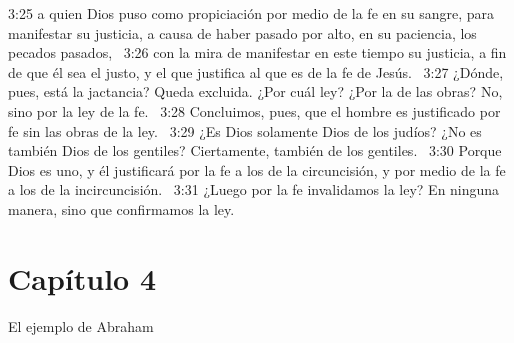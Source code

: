 3:25 a quien Dios puso como propiciación por medio de la fe en su sangre, para manifestar su justicia, a causa de haber pasado por alto, en su paciencia, los pecados pasados,  
3:26 con la mira de manifestar en este tiempo su justicia, a fin de que él sea el justo, y el que justifica al que es de la fe de Jesús.  
3:27 ¿Dónde, pues, está la jactancia? Queda excluida. ¿Por cuál ley? ¿Por la de las obras? No, sino por la ley de la fe.  
3:28 Concluimos, pues, que el hombre es justificado por fe sin las obras de la ley.  
3:29 ¿Es Dios solamente Dios de los judíos? ¿No es también Dios de los gentiles? Ciertamente, también de los gentiles.  
3:30 Porque Dios es uno, y él justificará por la fe a los de la circuncisión, y por medio de la fe a los de la incircuncisión.  
3:31 ¿Luego por la fe invalidamos la ley? En ninguna manera, sino que confirmamos la ley.  
\section*{Capítulo 4}
El ejemplo de Abraham  

